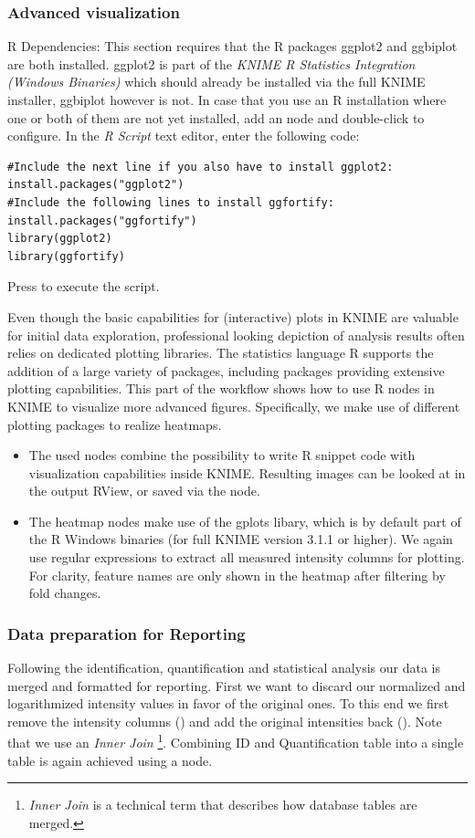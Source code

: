 \subsubsection{Advanced visualization}
\label{sec:metaboR}
R Dependencies: This section requires that the R packages ggplot2 and ggbiplot are both installed. ggplot2 is part of the \textit{KNIME R Statistics Integration (Windows Binaries)} which should already be installed via the full KNIME installer, ggbiplot however is not.
In case that you use an R installation where one or both of them are not yet installed, add an  node and double-click to configure. In the \textit{R Script} text editor, enter the following code:
\begin{lstlisting}
#Include the next line if you also have to install ggplot2:
install.packages("ggplot2")
#Include the following lines to install ggfortify:
install.packages("ggfortify")
library(ggplot2)
library(ggfortify)
\end{lstlisting}
Press  to execute the script.\newline

Even though the basic capabilities for (interactive) plots in KNIME are valuable for initial data exploration, professional looking depiction of analysis results often relies on dedicated plotting libraries. The statistics language R supports the addition of a large variety of packages, including packages providing extensive plotting capabilities. This part of the workflow shows how to use R nodes in KNIME to visualize more advanced figures. Specifically, we make use of different plotting packages to realize heatmaps.


\begin{itemize}
\item The used  nodes combine the possibility to write R snippet code with visualization capabilities inside KNIME. Resulting images can be looked at in the output RView, or saved via the  node.
\item The heatmap nodes make use of the gplots libary, which is by default part of the R Windows binaries (for full KNIME version 3.1.1 or higher). We again use regular expressions to extract all measured intensity columns for plotting. For clarity, feature names are only shown in the heatmap after filtering by fold changes.
\end{itemize}

\subsubsection{Data preparation for Reporting}
Following the identification, quantification and statistical analysis our data is merged and formatted for reporting.
First we want to discard our normalized and logarithmized intensity values in favor of the original ones.
To this end we first remove the intensity columns () and add the original intensities back ().
Note that we use an \textit{Inner Join} \footnote{\textit{Inner Join} is a technical term that describes how database tables are merged.}.
Combining ID and Quantification table into a single table is again achieved using a  node.

